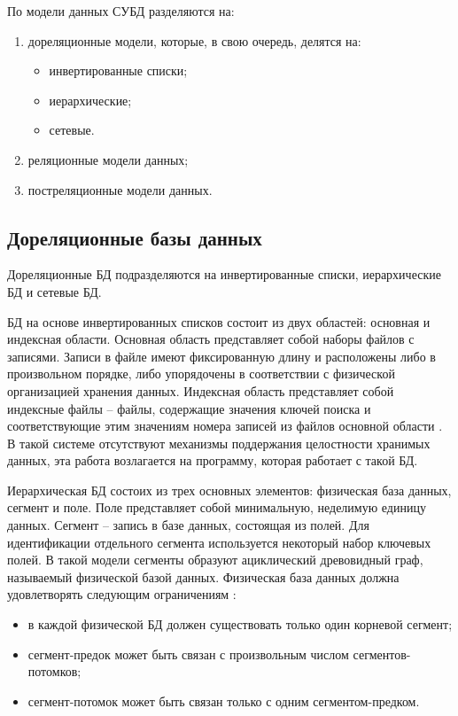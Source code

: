 По модели данных СУБД разделяются на:

\begin{enumerate}
	\item дореляционные модели, которые, в свою очередь, делятся на:
	\begin{itemize}
		\item инвертированные списки;
		\item иерархические;
		\item сетевые.
	\end{itemize}
	\item реляционные модели данных;
	\item постреляционные модели данных.
\end{enumerate}

\subsection{Дореляционные базы данных}

Дореляционные БД подразделяются на инвертированные списки, иерархические БД и сетевые БД.

БД на основе инвертированных списков состоит из двух областей: основная и индексная области. Основная область представляет собой наборы файлов с записями. Записи в файле имеют фиксированную длину и расположены либо в произвольном порядке, либо упорядочены в соответствии с физической организацией хранения данных. Индексная область представляет собой индексные файлы -- файлы, содержащие значения ключей поиска и соответствующие этим значениям номера записей из файлов основной области \cite{info_inverted_lists}. В такой системе отсутствуют механизмы поддержания целостности хранимых данных, эта работа возлагается на программу, которая работает с такой БД.

Иерархическая БД состоих из трех основных элементов: физическая база данных, сегмент и поле. Поле представляет собой минимальную, неделимую единицу данных. Сегмент -- запись в базе данных, состоящая из полей. Для идентификации отдельного сегмента используется некоторый набор ключевых полей. В такой модели сегменты образуют ациклический древовидный граф, называемый физической базой данных. Физическая база данных должна удовлетворять следующим ограничениям \cite{info_inverted_lists}: 

\begin{itemize}[label*=--]
	\item в каждой физической БД должен существовать только один корневой сегмент;
	\item сегмент-предок может быть связан с произвольным числом сегментов-потомков;
	\item сегмент-потомок может быть связан только с одним сегментом-предком.
\end{itemize}

